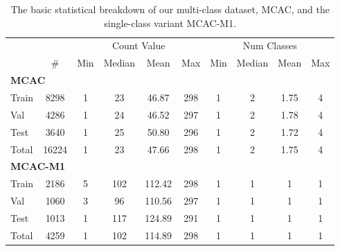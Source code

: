 \begin{table}
	\centering
	\begin{tabular}{lccccccccc}
		\toprule
		     & &\multicolumn{4}{c}{Count Value} & \multicolumn{4}{c}{Num Classes} \\
		     & \# & Min  & Median & Mean  & Max & Min & Median & Mean  & Max\\
		\midrule
		\multicolumn{4}{l}{\textbf{MCAC}} \\
		Train & 8298 & 1 & 23 & 46.87  & 298 & 1 & 2 &  1.75 & 4\\
		Val & 4286 & 1 & 24 & 46.52 & 297 & 1 & 2 &  1.78 & 4\\
		Test & 3640 & 1 & 25 & 50.80  & 296  & 1 & 2 &  1.72  & 4\\
  		Total & 16224 & 1 & 23 & 47.66  & 298  & 1 & 2 &  1.75  & 4\\
      \midrule
    \multicolumn{4}{l}{\textbf{MCAC-M1}} \\
		Train & 2186 & 5 & 102 & 112.42 & 298  & 1 & 1 &  1  & 1\\
		Val & 1060 & 3 & 96 & 110.56 & 297 & 1 & 1 &  1  & 1\\
		Test & 1013 & 1 & 117 & 124.89 & 291   & 1 & 1 &  1  & 1\\
  		Total & 4259 & 1 & 102 & 114.89 & 298  & 1 & 1 &  1  & 1 \\
		\bottomrule
	\end{tabular}
	\caption{The basic statistical breakdown of our multi-class dataset, MCAC, and the single-class variant MCAC-M1.}
	\label{tab__multiclass_dataset_stats}
\end{table}